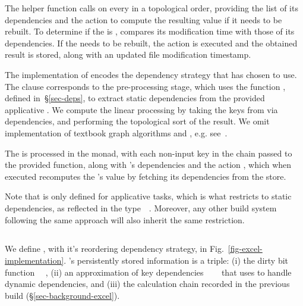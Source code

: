 The helper function  calls  on every  in
a topological order, providing the list of its dependencies  and the
action  to compute the resulting value if it needs to be rebuilt. To
determine if the  is ,  compares its modification
time with those of its dependencies. If the  needs to be rebuilt, the
action  is executed and the obtained result is stored, along with an
updated file modification timestamp.

The implementation of  encodes the dependency strategy that
\Make has chosen to use. The  clause corresponds to the pre-processing
stage, which uses the function , defined in~\S\ref{sec-deps},
to extract static dependencies from the provided applicative . We
compute the linear processing  by taking the keys 
from  via dependencies, and performing the topological sort of the
result. We omit implementation of textbook graph algorithms
 and , e.g.
see~\cite{cormen2001introduction}.

The  is processed in the  monad, with each non-input key
 in the chain passed to the provided  function, along with
's dependencies and the action , which when executed recomputes
the 's value by fetching its dependencies from the store.

Note that  is only defined for applicative tasks, which is what
restricts \Make to static dependencies, as reflected in the
type~~. Moreover, any other build system following
the same  approach will also inherit the same restriction.

\subsection{\Excel}\label{sec-implementation-excel}

We define \Excel, with it's reordering dependency strategy, in  Fig.~\ref{fig-excel-implementation}.
\Excel's persistently stored information is a triple: (i) the dirty bit
function ~\hs{->}~, (ii) an approximation of key dependencies
~\hs{->}~~ that \Excel uses to handle
dynamic dependencies, and (iii) the calculation chain \hs{[@@k]} recorded in the
previous build (\S\ref{sec-background-excel}).

